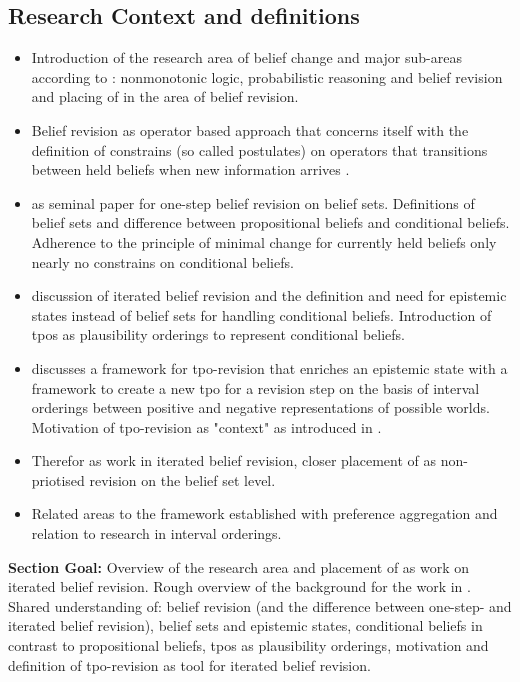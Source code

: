 \documentclass[11pt]{article}
\begin{document}
\subsection{Research Context and definitions}
\begin{itemize}
    \item Introduction of the research area of belief change and major sub-areas according to \cite{Darwiche1997}: nonmonotonic logic, probabilistic reasoning and belief revision and placing of \cite{Booth2011} in the area of belief revision.
    \item Belief revision as operator based approach that concerns itself with the definition of constrains (so called postulates) on operators that transitions between held beliefs when new information arrives \cite{Darwiche1997}.
    \item \cite{Alchourron1985} as seminal paper for one-step belief revision on belief sets. Definitions of belief sets and difference between propositional beliefs and conditional beliefs. Adherence to the principle of minimal change for currently held beliefs only nearly no constrains on conditional beliefs.
    \item \cite{Darwiche1997} discussion of iterated belief revision and the definition and need for epistemic states instead of belief sets for handling conditional beliefs. Introduction of tpos as plausibility orderings to represent conditional beliefs.
    \item \cite{Booth2011} discusses a framework for tpo-revision that enriches an epistemic state with a framework to create a new tpo for a revision step on the basis of interval orderings between positive and negative representations of possible worlds. Motivation of tpo-revision as "context" as introduced in \cite{Booth2007}.
    \item Therefor \cite{Booth2011} as work in iterated belief revision, closer placement of \cite{Booth2011} as non-priotised revision on the belief set level.
    \item Related areas to the framework established \cite{Booth2011} with preference aggregation and relation to research in interval orderings.
\end{itemize}
\textbf{Section Goal:} Overview of the research area and placement of \cite{Booth2011} as work on iterated belief revision. Rough overview of the background for the work in \cite{Booth2011}. Shared understanding of: belief revision (and the difference between one-step- and iterated belief revision), belief sets and epistemic states, conditional beliefs in contrast to propositional beliefs, tpos as plausibility orderings, motivation and definition of tpo-revision as tool for iterated belief revision.
\end{document}
